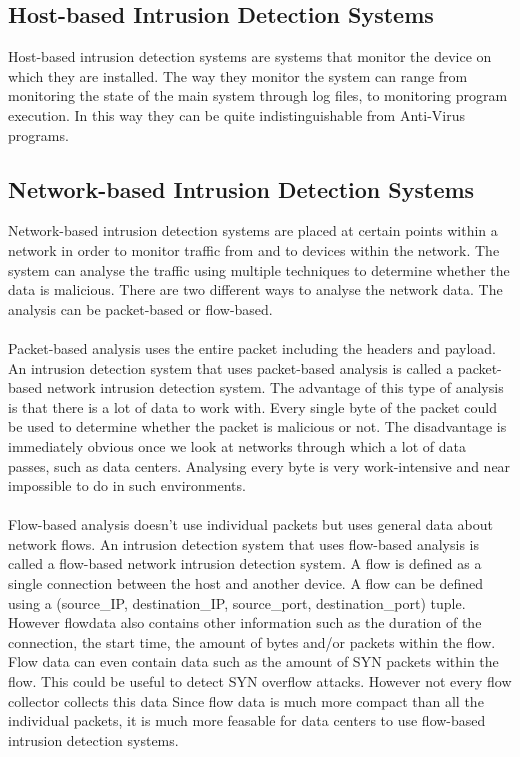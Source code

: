 \subsection{Host-based Intrusion Detection Systems}
Host-based intrusion detection systems are systems that monitor the device on which they are installed. The way they monitor the system can range from monitoring the state of the main system through log files, to monitoring program execution. In this way they can be quite indistinguishable from Anti-Virus programs.

\subsection{Network-based Intrusion Detection Systems}
Network-based intrusion detection systems are placed at certain points within a network in order to monitor traffic from and to devices within the network. The system can analyse the traffic using multiple techniques to determine whether the data is malicious. There are two different ways to analyse the network data. The analysis can be packet-based or flow-based.\\
\\
Packet-based analysis uses the entire packet including the headers and payload. An intrusion detection system that uses packet-based analysis is called a packet-based network intrusion detection system. The advantage of this type of analysis is that there is a lot of data to work with. Every single byte of the packet could be used to determine whether the packet is malicious or not. The disadvantage is immediately obvious once we look at networks through which a lot of data passes, such as data centers. Analysing every byte is very work-intensive and near impossible to do in such environments. \cite{alaidaros2011overview} \\
\\
Flow-based analysis doesn't use individual packets but uses general data about network flows. An intrusion detection system that uses flow-based analysis is called a flow-based network intrusion detection system. A flow is defined as a single connection between the host and another device. A flow can be defined using a (source\_IP, destination\_IP, source\_port, destination\_port) tuple. However flowdata also contains other information such as the duration of the connection, the start time, the amount of bytes and/or packets within the flow. Flow data can even contain data such as the amount of SYN packets within the flow. This could be useful to detect SYN overflow attacks. However not every flow collector collects this data Since flow data is much more compact than all the individual packets, it is much more feasable for data centers to use flow-based intrusion detection systems. 

